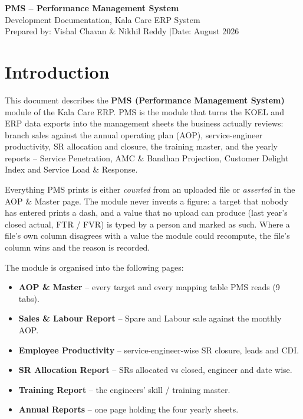 \documentclass[11pt,a4paper]{article}
\begin{document}
\begin{center}
  {\LARGE\bfseries PMS -- Performance Management System}\\[10pt]
  {\large Development Documentation, Kala Care ERP System}\\[14pt]
  {\normalsize Prepared by: Vishal Chavan \& Nikhil Reddy \quad$|$\quad Date: August 2026}
\end{center}

\vspace{10pt}

\section{Introduction}

This document describes the \textbf{PMS (Performance Management System)} module of the
Kala Care ERP. PMS is the module that turns the KOEL and ERP data exports into the
management sheets the business actually reviews: branch sales against the annual
operating plan (AOP), service-engineer productivity, SR allocation and closure,
the training master, and the yearly reports -- Service Penetration, AMC \& Bandhan
Projection, Customer Delight Index and Service Load \& Response.

Everything PMS prints is either \emph{counted} from an uploaded file or \emph{asserted}
in the AOP \& Master page. The module never invents a figure: a target that nobody has
entered prints a dash, and a value that no upload can produce (last year's closed
actual, FTR / FVR) is typed by a person and marked as such. Where a file's own column
disagrees with a value the module could recompute, the file's column wins and the
reason is recorded.

The module is organised into the following pages:
\begin{itemize}
  \item \textbf{AOP \& Master} -- every target and every mapping table PMS reads (9 tabs).
  \item \textbf{Sales \& Labour Report} -- Spare and Labour sale against the monthly AOP.
  \item \textbf{Employee Productivity} -- service-engineer-wise SR closure, leads and CDI.
  \item \textbf{SR Allocation Report} -- SRs allocated vs closed, engineer and date wise.
  \item \textbf{Training Report} -- the engineers' skill / training master.
  \item \textbf{Annual Reports} -- one page holding the four yearly sheets.
\end{itemize}
\end{document}
